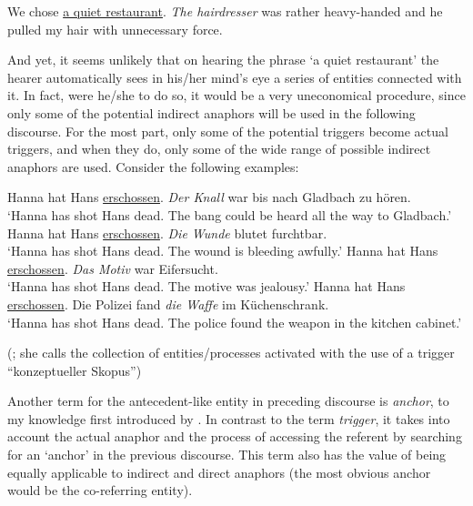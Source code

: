 \documentclass[output=paper]{langsci/langscibook}
\begin{document}
\begin{exe}
\ex\label{6ex:10}
We chose {\ul{a quiet restaurant}}. {\emph{The hairdresser}} was rather heavy-handed and he pulled my hair with unnecessary force.
\end{exe}

And yet, it seems unlikely that on hearing the phrase `a quiet restaurant' the hearer automatically sees in his/her mind's eye a series of entities connected with it. In fact, were he/she to do so, it would be a very uneconomical procedure, since only some of the potential indirect anaphors will be used in the following discourse. For the most part, only some of the potential triggers become actual triggers, and when they do, only some of the wide range of possible indirect anaphors are used. Consider the following examples:

\begin{exe}
\ex\label{6ex:11}
	\begin{xlista}
	\ex\label{6ex:11a}
	Hanna hat Hans {\ul{erschossen}}. {\emph{Der Knall}} war bis nach Gladbach zu hören. \\
	`Hanna has shot Hans dead. The bang could be heard all the way to Gladbach.'
	\ex\label{6ex:11b}
	Hanna hat Hans {\ul{erschossen}}. {\emph{Die Wunde}} blutet furchtbar. \\
	`Hanna has shot Hans dead. The wound is bleeding awfully.'
	\ex\label{6ex:11c}
	Hanna hat Hans {\ul{erschossen}}. {\emph{Das Motiv}} war Eifersucht. \\
	`Hanna has shot Hans dead. The motive was jealousy.'
	\ex\label{6ex:11d}
	Hanna hat Hans {\ul{erschossen}}. Die Polizei fand {\emph{die Waffe}} im Küchenschrank. \\
	`Hanna has shot Hans dead. The police found the weapon in the kitchen cabinet.'
	\end{xlista}
 (\citealt[][38]{schwarz:00}; she calls the collection of entities/processes activated with the use of a trigger ``konzeptueller Skopus'')
\end{exe}

Another term for the antecedent-like entity in preceding discourse is {\emph{anchor}}, to my knowledge first introduced by \cite{fraurud:90}. In contrast to the term {\emph{trigger}}, it takes into account the actual anaphor and the process of accessing the referent by searching for an `anchor' in the previous discourse. This term also has the value of being equally applicable to indirect and direct anaphors (the most obvious anchor would be the co-referring entity).
\end{document}

